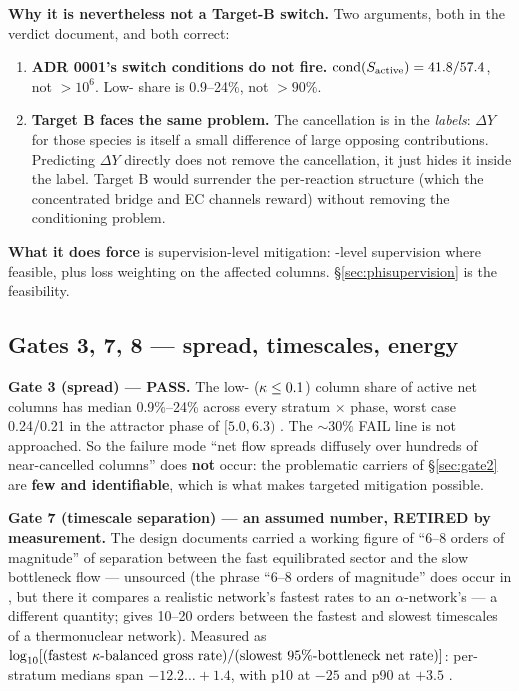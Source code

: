 \textbf{Why it is nevertheless not a Target-B switch.} Two arguments, both in
the verdict document, and both correct:

\begin{enumerate}
\item \textbf{ADR 0001's switch conditions do not fire.} $\operatorname{cond}(S_{\mathrm{active}}) =
  41.8/57.4$, not $> 10^{6}$. Low-\kap{} share is 0.9--24\%, not $> 90\%$.
\item \textbf{Target B faces the same problem.} The cancellation is in the
  \emph{labels}: $\Delta Y$ for those species is itself a small difference of
  large opposing contributions. Predicting $\Delta Y$ directly does not remove
  the cancellation, it just hides it inside the label. Target B would surrender
  the per-reaction structure (which the concentrated bridge and EC channels
  reward) without removing the conditioning problem.
\end{enumerate}

\textbf{What it does force} is supervision-level mitigation: \Phifl-level
supervision where feasible, plus loss weighting on the affected columns.
\S\ref{sec:phisupervision} is the feasibility.

\subsection{Gates 3, 7, 8 --- spread, timescales, energy}
\label{sec:gates378}

\textbf{Gate 3 (spread) --- PASS.} The low-\kap{} ($\kappa \le 0.1$) column share
of active net columns has median 0.9\%--24\% across every stratum $\times$
phase, worst case 0.24/0.21 in the attractor phase of $[5.0, 6.3)$
. The ${\sim}30\%$ FAIL line is not approached. So the
failure mode ``net flow spreads diffusely over hundreds of near-cancelled
columns'' does \textbf{not} occur: the problematic carriers of
\S\ref{sec:gate2} are \textbf{few and identifiable}, which is what makes
targeted mitigation possible.

\textbf{Gate 7 (timescale separation) --- an assumed number, RETIRED by
measurement.} The design documents carried a working figure of ``6--8 orders of
magnitude'' of separation between the fast equilibrated sector and the slow
bottleneck flow --- unsourced (the phrase ``6--8 orders of magnitude'' does
occur in \citet{guidry2013a}, but there it compares a realistic network's
fastest rates to an $\alpha$-network's --- a different quantity;
\citet{guidry2012} gives 10--20 orders between the fastest and slowest
timescales of a thermonuclear network). Measured as
$\log_{10}[(\text{fastest \ensuremath{\kappa}-balanced gross rate})/(\text{slowest
95\%-bottleneck net rate})]$: per-stratum medians span
\textbf{$-12.2 \ldots +1.4$}, with p10 at $-25$ and p90 at $+3.5$
.

